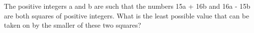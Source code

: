 \item The positive integers a and b are such that the numbers 15a + 16b and 16a - 15b are both squares of positive integers. What is the least possible value that can be taken on by the smaller of these two squares?





